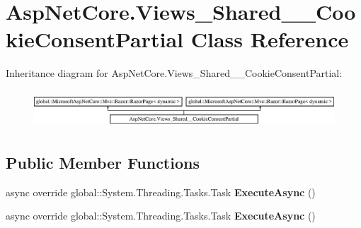 \hypertarget{class_asp_net_core_1_1_views___shared_____cookie_consent_partial}{}\section{Asp\+Net\+Core.\+Views\+\_\+\+Shared\+\_\+\+\_\+\+Cookie\+Consent\+Partial Class Reference}
\label{class_asp_net_core_1_1_views___shared_____cookie_consent_partial}
Inheritance diagram for Asp\+Net\+Core.\+Views\+\_\+\+Shared\+\_\+\+\_\+\+Cookie\+Consent\+Partial\+:\begin{figure}[H]
\begin{center}
\leavevmode
\includegraphics[height=1.432225cm]{class_asp_net_core_1_1_views___shared_____cookie_consent_partial}
\end{center}
\end{figure}
\subsection*{Public Member Functions}
\begin{DoxyCompactItemize}
\item 
\mbox{\label{class_asp_net_core_1_1_views___shared_____cookie_consent_partial_a4f0f4a2fb8817375e2d9e2ef6a603624}} 
async override global\+::\+System.\+Threading.\+Tasks.\+Task {\bfseries Execute\+Async} ()
\item 
\mbox{\label{class_asp_net_core_1_1_views___shared_____cookie_consent_partial_a4f0f4a2fb8817375e2d9e2ef6a603624}} 
async override global\+::\+System.\+Threading.\+Tasks.\+Task {\bfseries Execute\+Async} ()
\end{DoxyCompactItemize}
